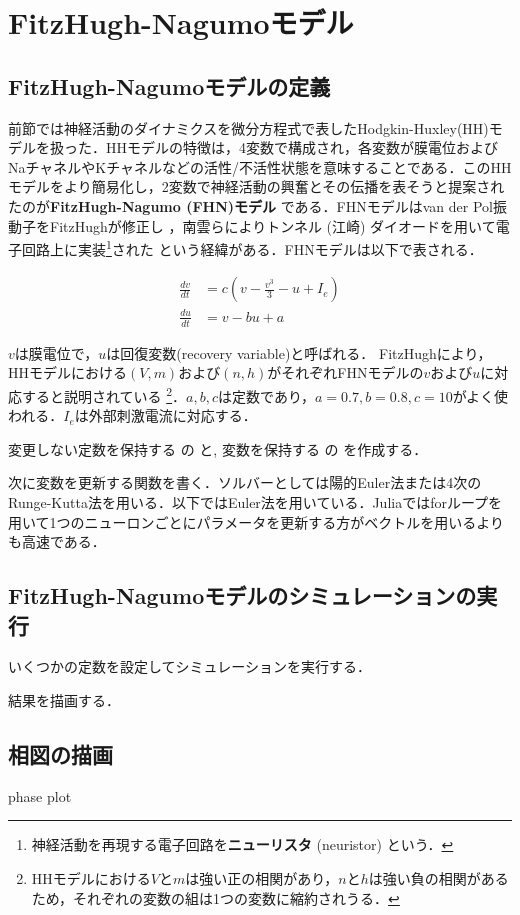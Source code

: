 \section{FitzHugh-Nagumoモデル}
\subsection{FitzHugh-Nagumoモデルの定義}

前節では神経活動のダイナミクスを微分方程式で表したHodgkin-Huxley(HH)モデルを扱った．HHモデルの特徴は，4変数で構成され，各変数が膜電位およびNaチャネルやKチャネルなどの活性/不活性状態を意味することである．このHHモデルをより簡易化し，2変数で神経活動の興奮とその伝播を表そうと提案されたのが\textbf{FitzHugh-Nagumo (FHN)モデル} である．FHNモデルはvan der Pol振動子をFitzHughが修正し\cite{FitzHugh1955-bx} \cite{Fitzhugh1961-fp}，南雲らによりトンネル (江崎) ダイオードを用いて電子回路上に実装\footnote{神経活動を再現する電子回路を\textbf{ニューリスタ}  (neuristor) という．}された \cite{Nagumo1962-ob}という経緯がある．FHNモデルは以下で表される．


\begin{align} 
\frac{dv}{dt} &= c\left(v-\frac{v^3}{3}-u+I_e\right)\\ 
\frac{du}{dt} &= v-bu+a 
\end{align}


$v$は膜電位で，$u$は回復変数(recovery variable)と呼ばれる． FitzHughにより，HHモデルにおける$(V, m)$および$(n, h)$がそれぞれFHNモデルの$v$および$u$に対応すると説明されている \cite{Fitzhugh1961-fp} \footnote{HHモデルにおける$V$と$m$は強い正の相関があり，$n$と$h$は強い負の相関があるため，それぞれの変数の組は1つの変数に縮約されうる．}．$a,b,c$は定数であり，$a=0.7, b=0.8, c=10$がよく使われる．$I_e$は外部刺激電流に対応する．

変更しない定数を保持する  の  と, 変数を保持する  の  を作成する．

次に変数を更新する関数を書く．ソルバーとしては陽的Euler法または4次のRunge-Kutta法を用いる．以下ではEuler法を用いている．Juliaではforループを用いて1つのニューロンごとにパラメータを更新する方がベクトルを用いるよりも高速である．

\subsection{FitzHugh-Nagumoモデルのシミュレーションの実行}
いくつかの定数を設定してシミュレーションを実行する．

結果を描画する．


\subsection{相図の描画}
phase plot



